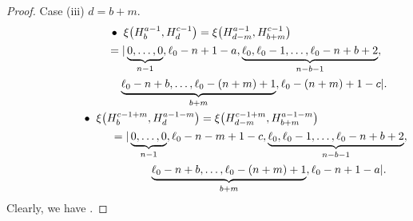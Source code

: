 \documentclass[10pt,a4paper]{amsart}
\numberwithin{equation}{section}
\begin{document}
\begin{proof}
Case (iii) $d=b+m$.
\begin{gather*}
\hspace{-3.85mm}\bullet\hspace{2mm}
\xi\bigl(H^{a-1}_{b}, H^{c-1}_{d}\bigr)=\xi\bigl(H^{a-1}_{d-m}, H^{c-1}_{b+m}\bigr)\\
\hphantom{\hspace{-3.85mm}\bullet\hspace{2mm}\xi\bigl(H^{a-1}_{b}, H^{c-1}_{d}\bigr)}{}
=|\underbrace{0,\dots,0}_{n-1},\ell_{0}-n+1-a,\underbrace{\ell_{0},\ell_{0}-1,\dots,\ell_{0}-n+b+2}_{n-b-1},\\
\hphantom{\hspace{-3.85mm}\bullet\hspace{2mm}\xi\bigl(H^{a-1}_{b}, H^{c-1}_{d}\bigr)=|}{}
\underbrace{\ell_{0}-n+b,\dots,\ell_{0}-(n+m)+1}_{b+m},\ell_{0}-(n+m)+1-c|.\\
\hspace{-3.85mm}\bullet\hspace{2mm}
\xi\bigl(H^{c-1+m}_{b}, H^{a-1-m}_{d}\bigr)=\xi\bigl(H^{c-1+m}_{d-m},H^{a-1-m}_{b+m}\bigr)\\
\hphantom{\hspace{-3.85mm}\bullet\hspace{2mm}\xi\bigl(H^{c-1+m}_{b}, H^{a-1-m}_{d}\bigr)}{}
=|\underbrace{0,\dots,0}_{n-1},\ell_{0}-n-m+1-c,\underbrace{\ell_{0},\ell_{0}-1,\dots,\ell_{0}-n+b+2}_{n-b-1},\\
\hphantom{\hspace{-3.85mm}\bullet\hspace{2mm}\xi\bigl(H^{c-1+m}_{b}, H^{a-1-m}_{d}\bigr)=|}{}
\underbrace{\ell_{0}-n+b,\dots,\ell_{0}-(n+m)+1}_{b+m},\ell_{0}-n+1-a|.
\end{gather*}
Clearly, we have .





\end{proof}
\end{document}
